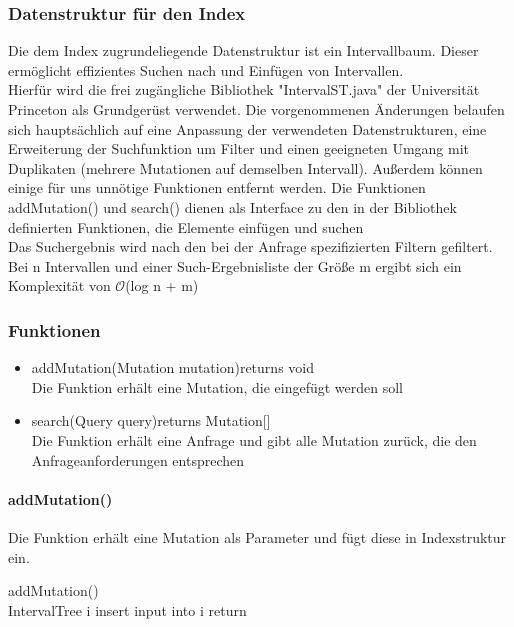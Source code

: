 \subsubsection{Datenstruktur für den Index}
Die dem Index zugrundeliegende Datenstruktur ist ein Intervallbaum. Dieser ermöglicht effizientes Suchen nach und Einfügen von Intervallen.\\
Hierfür wird die frei zugängliche Bibliothek "IntervalST.java" der Universität Princeton als Grundgerüst verwendet. Die vorgenommenen Änderungen belaufen sich hauptsächlich auf eine Anpassung der verwendeten Datenstrukturen, eine Erweiterung der Suchfunktion um Filter und einen geeigneten Umgang mit Duplikaten (mehrere Mutationen auf demselben Intervall). Außerdem können einige für uns unnötige Funktionen entfernt werden. Die Funktionen addMutation() und search() dienen als Interface zu den in der Bibliothek definierten Funktionen, die Elemente einfügen und suchen\\
Das Suchergebnis wird nach den bei der Anfrage spezifizierten Filtern gefiltert. Bei n Intervallen und einer Such-Ergebnisliste der Größe m ergibt sich ein Komplexität von $\mathcal{O}$(log n + m)\\
\subsubsection{Funktionen}
\begin{itemize}
\item addMutation(Mutation mutation)returns void\\
Die Funktion erhält eine Mutation, die eingefügt werden soll
\item search(Query query)returns Mutation[]\\
Die Funktion erhält eine Anfrage und gibt alle Mutation zurück, die den Anfrageanforderungen entsprechen
\end{itemize}
\newpage
\paragraph{addMutation()}
Die Funktion erhält eine Mutation als Parameter und fügt diese in Indexstruktur ein.
\begin{algorithm}
addMutation()\\
IntervalTree i\;
insert input into i\;
return\;
\end{algorithm}
